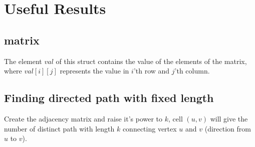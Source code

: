 \documentclass[8pt, a4paper, twocolumn]{article}
\begin{document}
\section{Useful Results}

\subsection{matrix}
The element $val$ of this struct contains the value of the elements of the matrix, where $val[i][j]$ represents the value in $i$'th row and $j$'th column.



\subsection{Finding directed path with fixed length}
Create the adjacency matrix and raise it's power to $k$, cell $(u,v)$ will give the number of distinct path with length $k$ connecting vertex $u$ and $v$ (direction from $u$ to $v$).
\end{document}
